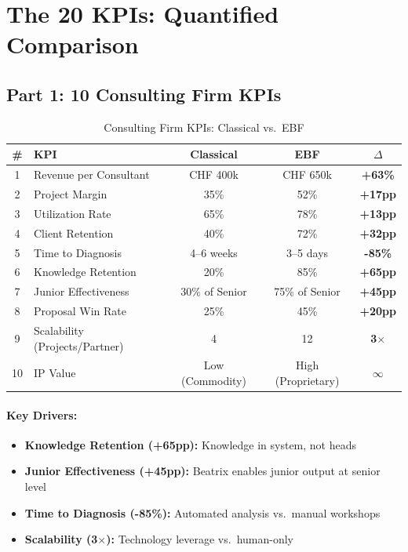 
\section{The 20 KPIs: Quantified Comparison}
\label{sec:consulting-kpis}

\subsection{Part 1: 10 Consulting Firm KPIs}

\begin{table}[htbp]
\centering
\caption{Consulting Firm KPIs: Classical vs.\ EBF}
\label{tab:firm-kpis}
\renewcommand{\arraystretch}{1.3}
\small
\begin{tabular}{@{}clccc@{}}
\toprule
\textbf{\#} & \textbf{KPI} & \textbf{Classical} & \textbf{EBF} & \textbf{$\Delta$} \\
\midrule
1 & Revenue per Consultant & CHF 400k & CHF 650k & \textbf{+63\%} \\
2 & Project Margin & 35\% & 52\% & \textbf{+17pp} \\
3 & Utilization Rate & 65\% & 78\% & \textbf{+13pp} \\
4 & Client Retention & 40\% & 72\% & \textbf{+32pp} \\
5 & Time to Diagnosis & 4--6 weeks & 3--5 days & \textbf{-85\%} \\
6 & Knowledge Retention & 20\% & 85\% & \textbf{+65pp} \\
7 & Junior Effectiveness & 30\% of Senior & 75\% of Senior & \textbf{+45pp} \\
8 & Proposal Win Rate & 25\% & 45\% & \textbf{+20pp} \\
9 & Scalability (Projects/Partner) & 4 & 12 & \textbf{3$\times$} \\
10 & IP Value & Low (Commodity) & High (Proprietary) & \textbf{$\infty$} \\
\bottomrule
\end{tabular}
\end{table}

\paragraph{Key Drivers:}
\begin{itemize}[nosep]
    \item \textbf{Knowledge Retention (+65pp):} Knowledge in system, not heads
    \item \textbf{Junior Effectiveness (+45pp):} Beatrix enables junior output at senior level
    \item \textbf{Time to Diagnosis (-85\%):} Automated analysis vs.\ manual workshops
    \item \textbf{Scalability (3$\times$):} Technology leverage vs.\ human-only
\end{itemize}

